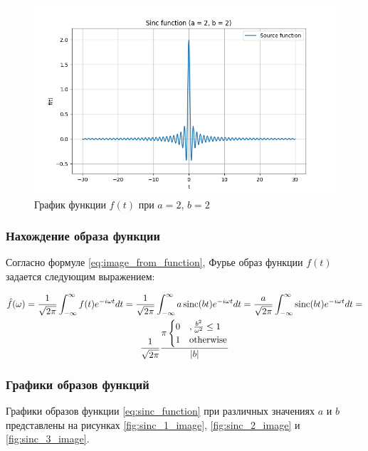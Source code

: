 \begin{figure}[ht!]
    \centering
    \includegraphics[width=\textwidth]{media/sinc_3.png}
    \caption{График функции $f(t)$ при $a = 2$, $b = 2$}
    \label{fig:sinc_3}
\end{figure}

\FloatBarrier
\subsubsection{Нахождение образа функции}
Согласно формуле \eqref{eq:image_from_function}, Фурье образ функции $f(t)$ задается следующим выражением:

\begin{multline}
    \hat{f}(\omega) = \frac{1}{\sqrt{2\pi}} \int_{-\infty}^{\infty} f(t) e^{-i\omega t} dt = \frac{1}{\sqrt{2\pi}} \int_{-\infty}^{\infty} a \operatorname{sinc}(bt) e^{-i\omega t} dt = \frac{a}{\sqrt{2\pi}} \int_{-\infty}^{\infty} \operatorname{sinc}(bt) e^{-i\omega t} dt = \\
    \frac{1}{\sqrt{2\pi}} \frac{\pi \begin{cases} 0 &, \frac{b^2}{\omega^2} \le 1 \\ 1 & \text{otherwise} \end{cases}}{|b|}
\end{multline}

\subsubsection{Графики образов функций}
Графики образов функции \eqref{eq:sinc_function} при различных значениях $a$ и $b$ представлены на рисунках \ref{fig:sinc_1_image}, \ref{fig:sinc_2_image} и \ref{fig:sinc_3_image}.

